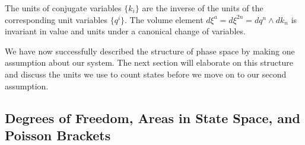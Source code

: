 \documentclass{article}[a4paper]
\begin{document}
	
	
	
\begin{prop}
	The units of conjugate variables $\{k_i\}$ are the inverse of the units of the corresponding unit variables $\{q^i\}$. The volume element $d\xi^a = d\xi^{2n} = dq^n \land dk_n$ is invariant in value and units under a canonical change of variables.
\end{prop}

We have now successfully described the structure of phase space by making one assumption about our system. The next section will elaborate on this structure and discuss the units we use to count states before we move on to our second assumption.

\subsection{Degrees of Freedom, Areas in State Space, and Poisson Brackets}
\end{document}
